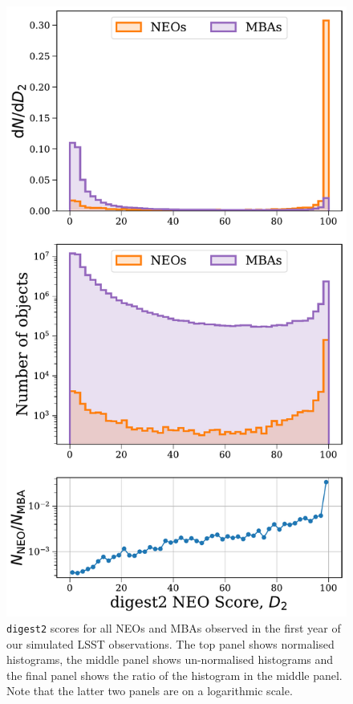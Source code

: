 \documentclass[twocolumn]{aastex631}
\newcommand{\dig}{\texttt{digest2}}
\begin{document}
\begin{figure}
    \centering
    \includegraphics[width=\columnwidth]{digest2_pollution.pdf}
    \caption{\dig{} scores for all NEOs and MBAs observed in the first year of our simulated LSST observations. The top panel shows normalised histograms, the middle panel shows un-normalised histograms and the final panel shows the ratio of the histogram in the middle panel. Note that the latter two panels are on a logarithmic scale.}
    \label{fig:digest2_example}
\end{figure}
\end{document}
